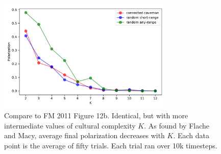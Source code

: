 \documentclass[11pt,letterpaper]{article}
\begin{document}
\begin{figure}
  \centering
      \includegraphics[width=0.75\textwidth]{Figures/finegrained_p_vs_K.pdf}
  \caption{
    Compare to FM 2011 Figure 12b. Identical, but with more intermediate
    values of cultural complexity $K$. As found by Flache and Macy, 
    average final polarization decreases with $K$. Each
    data point is the average of fifty trials. Each trial ran over 
    10k timesteps.
  }
  \label{fig:k_finegrained}
\end{figure}

\end{document}
